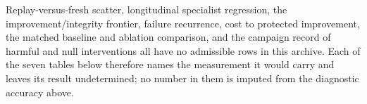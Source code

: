 


Replay-versus-fresh scatter, longitudinal specialist regression, the improvement/integrity frontier, failure recurrence, cost to protected improvement, the matched baseline and ablation comparison, and the campaign record of harmful and null interventions all have no admissible rows in this archive. Each of the seven tables below therefore names the measurement it would carry and leaves its result undetermined; no number in them is imputed from the diagnostic accuracy above.








